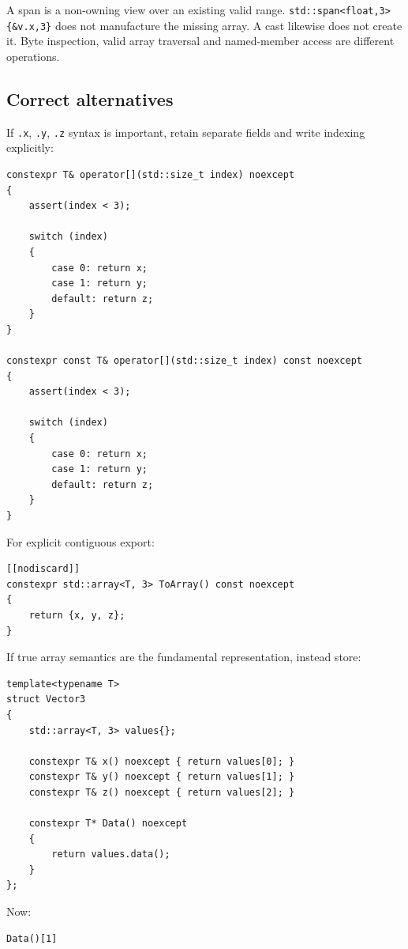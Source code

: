 A span is a non-owning view over an existing valid range. \texttt{std::span\textless{}float,3\textgreater{}\{\&v.x,3\}} does not manufacture the missing array. A cast likewise does not create it. Byte inspection, valid array traversal and named-member access are different operations.

\subsection{Correct alternatives}\label{05-engine-i-ch003-correct-alternatives}

If \texttt{.x}, \texttt{.y}, \texttt{.z} syntax is important, retain separate fields and write indexing explicitly:

\begin{verbatim}
constexpr T& operator[](std::size_t index) noexcept
{
    assert(index < 3);

    switch (index)
    {
        case 0: return x;
        case 1: return y;
        default: return z;
    }
}

constexpr const T& operator[](std::size_t index) const noexcept
{
    assert(index < 3);

    switch (index)
    {
        case 0: return x;
        case 1: return y;
        default: return z;
    }
}
\end{verbatim}

For explicit contiguous export:

\begin{verbatim}
[[nodiscard]]
constexpr std::array<T, 3> ToArray() const noexcept
{
    return {x, y, z};
}
\end{verbatim}

If true array semantics are the fundamental representation, instead store:

\begin{verbatim}
template<typename T>
struct Vector3
{
    std::array<T, 3> values{};

    constexpr T& x() noexcept { return values[0]; }
    constexpr T& y() noexcept { return values[1]; }
    constexpr T& z() noexcept { return values[2]; }

    constexpr T* Data() noexcept
    {
        return values.data();
    }
};
\end{verbatim}

Now:

\begin{verbatim}
Data()[1]
\end{verbatim}

